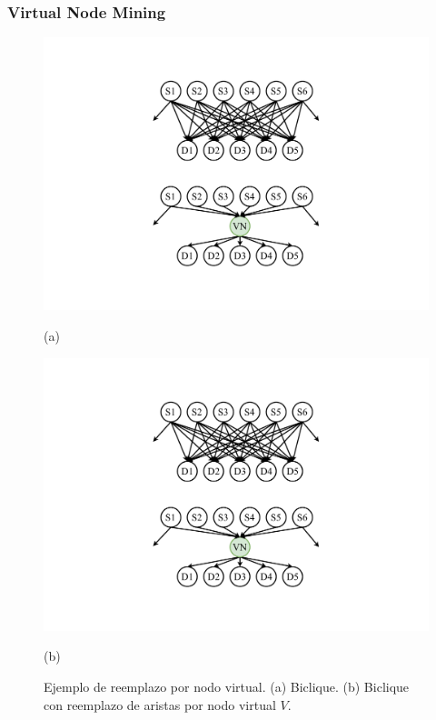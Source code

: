 \begin{frame}
\frametitle{Virtual Node Mining}

\begin{figure}%
    	\centering
    	\begin{minipage}{0.45\textwidth}
    		\centering
    		\includegraphics[scale=.3, clip,  trim=230 320 230 80]{../img/arte/graphs-virtual2.pdf}
    		
    		(a)
    	\end{minipage}
    	\begin{minipage}{0.45\textwidth}
    		\centering
    		\includegraphics[scale=.3, clip,  trim=230 80 230 320]{../img/arte/graphs-virtual2.pdf}
    		
    		(b)
    	\end{minipage}

    \caption{Ejemplo de reemplazo por nodo virtual. (a) Biclique. (b) Biclique con reemplazo de aristas por nodo virtual $V$.}
\end{figure}

\end{frame}


